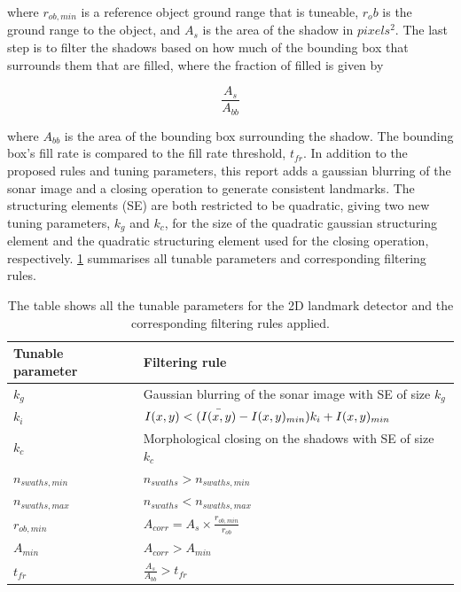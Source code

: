 where $r_{ob, min}$ is a reference object ground range that is tuneable, $r_ob$ is the ground range to the object, and $A_s$ is the area of the shadow in $pixels^2$. The last step is to filter the shadows based on how much of the bounding box that surrounds them that are filled, where the fraction of filled is given by

\begin{equation}
    \frac{A_s}{A_{bb}}
    \label{eq:fill_rate_bb}
\end{equation}

where $A_{bb}$ is the area of the bounding box surrounding the shadow. The bounding box's fill rate is compared to the fill rate threshold, $t_{fr}$. In addition to the proposed rules and tuning parameters, this report adds a gaussian blurring of the sonar image and a closing operation to generate consistent landmarks. The structuring elements (SE) are both restricted to be quadratic, giving two new tuning parameters, $k_g$ and $k_c$, for the size of the quadratic gaussian structuring element and the quadratic structuring element used for the closing operation, respectively. \cref{tab:2D_tuning_rules} summarises all tunable parameters and corresponding filtering rules. 

\begin{table}
    \begin{center}
    \caption{The table shows all the tunable parameters for the 2D landmark detector and the corresponding filtering rules applied.}
    \begin{tabular}{ll}
        \hline
        \textbf{Tunable parameter} & \textbf{Filtering rule}                            \\ \hline
        $k_g$             & Gaussian blurring of the sonar image with SE of size $k_g$  \\ 
        $k_i$             & $I(x,y) < (\Bar{I(x,y)} - I(x,y)_{min}) k_i + I(x,y)_{min}$ \\ 
        $k_c$             & Morphological closing on the shadows with SE of size $k_c$  \\ 
        $n_{swaths,min}$  & $n_{swaths} > n_{swaths,min}$                               \\ 
        $n_{swaths,max}$  & $n_{swaths} < n_{swaths,max}$                               \\ 
        $r_{ob,min}$      & $A_{corr} = A_s \times \frac{r_{ob,min}}{r_{ob}}$           \\ 
        $A_{min}$         & $A_{corr} > A_{min}$                                        \\ 
        $t_{fr}$          & $\frac{A_s}{A_{bb}} > t_{fr}$                               \\ 
        \hline
    \end{tabular}
    \end{center}
    \label{tab:2D_tuning_rules}
\end{table}

